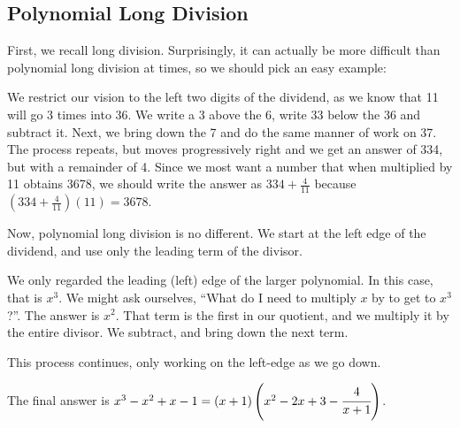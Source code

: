
\subsection{Polynomial Long Division}



First, we recall long division.  Surprisingly, it can actually be more difficult than polynomial long division at times, so we should pick an easy example:

\vspace{5mm}


We restrict our vision to the left two digits of the dividend, as we know that 11 will go 3 times into
36.  We write a 3 above the 6, write 33 below the 36 and subtract it.  Next, we bring down the 7
and do the same manner of work on 37.  The process repeats, but moves progressively right
and we get an answer of 334, but with a remainder of 4.  Since we most want a number that
when multiplied by 11 obtains 3678, we should write the answer as $334+\frac{4}{11}$ because
$\left(334+\frac{4}{11}\right)(11) = 3678$.


Now, polynomial long division is no different.  We start at the left edge of the dividend, and use 
only the leading term of the divisor.


We only regarded the leading (left) edge of the larger polynomial.  In this case, that is $x^3$.  
We might ask ourselves, ``What do I need to multiply $x$ by to get to $x^3$?''.  
The answer is $x^2$.   That term is the first in our quotient, and we multiply it by 
the entire divisor.  We subtract, and bring down the next term.


This process continues, only working on the left-edge as we go down.  


The final answer is $x^3-x^2+x-1 = (x+1)\left(x^2-2x+3-\cfrac{4}{x+1}\right)$.

